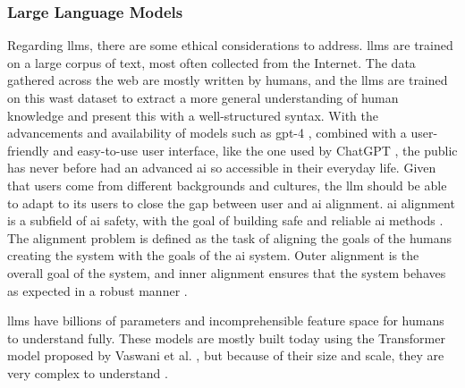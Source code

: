\subsubsection{Large Language Models}
Regarding \glspl{llm}, there are some ethical considerations to address. \glspl{llm} are trained on a large corpus of text, most often collected from the Internet. The data gathered across the web are mostly written by humans, and the \glspl{llm} are trained on this wast dataset to extract a more general understanding of human knowledge and present this with a well-structured syntax. With the advancements and availability of models such as \gls{gpt}-4 \cite{openaiGPT4TechnicalReport2023}, combined with a user-friendly and easy-to-use user interface, like the one used by ChatGPT \cite{ChatGPT}, the public has never before had an advanced \gls{ai} so accessible in their everyday life. Given that users come from different backgrounds and cultures, the \gls{llm} should be able to adapt to its users to close the gap between user and \gls{ai} alignment. 
\gls{ai} alignment is a subfield of \gls{ai} safety, with the goal of building safe and reliable \gls{ai} methods \cite{amodeiConcreteProblemsAI2016}. 
The alignment problem is defined as the task of aligning the goals of the humans creating the system with the goals of the \gls{ai} system. Outer alignment is the overall goal of the system, and inner alignment ensures that the system behaves as expected in a robust manner \cite{ngoAlignmentProblemDeep2023}.


\glspl{llm} have billions of parameters and incomprehensible feature space for humans to understand fully. These models are mostly built today using the Transformer model proposed by Vaswani et al. \cite{vaswaniAttentionAllYou2017}, but because of their size and scale, they are very complex to understand \cite{liptonMythosModelInterpretability2017a}. 




